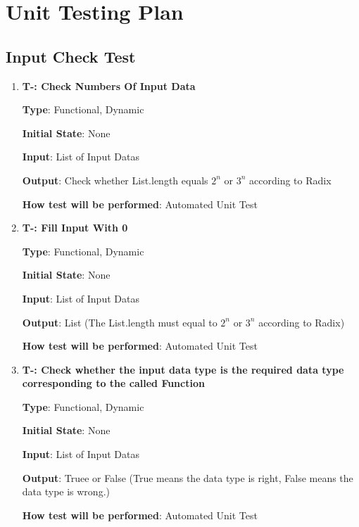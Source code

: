 \documentclass[12pt, titlepage]{article}
\newcounter{tnum}
\begin{document}
\section{Unit Testing Plan}
\subsection{Input Check Test}

\begin{enumerate}

\item{\textbf{T-\thetnum \label{CNI}: Check Numbers Of Input Data}}

\textbf {Type}: Functional, Dynamic
					
\textbf {Initial State}: None
					
\textbf {Input}: List of Input Datas
					
\textbf {Output}: Check whether List.length equals $2^n$ or $3^n$ according to Radix
					
\textbf {How test will be performed}: Automated Unit Test


\item{\textbf{T-\thetnum \label{FZ}: Fill Input With 0}}

\textbf {Type}: Functional, Dynamic
					
\textbf {Initial State}: None
					
\textbf {Input}: List of Input Datas 
					
\textbf {Output}: List (The List.length must equal to $2^n$ or $3^n$ according to Radix)
					
\textbf {How test will be performed}:  Automated Unit Test


\item{\textbf{T-\thetnum \label{DTC}: Check whether the input data type is the required data type corresponding to the called Function}}

\textbf {Type}: Functional, Dynamic
					
\textbf {Initial State}: None
					
\textbf {Input}:  List of Input Datas
					
\textbf {Output}: Truee or False (True means the data type is right, False means the data type is wrong.)
					
\textbf {How test will be performed}:  Automated Unit Test


\end{enumerate}		
\end{document}
